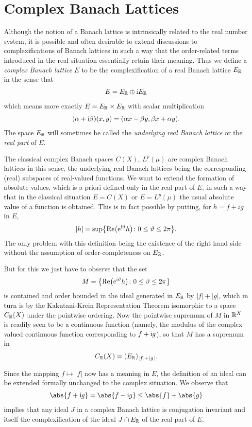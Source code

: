 \section{Complex Banach Lattices}\label{sec:c1-7}%
Although the notion of a Banach lattice is intrinsically related to the real number system, it is possible and often desirable to extend discussions to complexifications of Banach lattices in such a way that the order-related terms introduced in the real situation essentially retain their meaning.
Thus we define a \emph{complex Banach lattice} $ E $ to be the complexification of a real Banach lattice $ E_{\mathbb{R}} $ in the sense that
\[
E = E_{\mathbb{R}} \oplus \mathrm{i} E_{\mathbb{R}}
\]
which means more exactly $ E = E_{\mathbb{R}} \times E_{\mathbb{R}} $ with scalar multiplication 
%
\[
	 (\alpha+\mathrm{i}\beta)(x,y) = (\alpha x-\beta y,\beta x+\alpha y)  .
\]
%
The space $ E_{\mathbb{R}} $ will sometimes be called the \emph{underlying real Banach lattice} or the \emph{real part} of\/ $ E $.

The classical complex Banach spaces $ C(X) $, $ L^{p}(\mu) $ are complex Banach lattices in this sense, the underlying real Banach lattices being the corresponding (real) subspaces of real-valued functions.
We want to extend the formation of absolute values, which is a priori defined only in the real part of\/ $ E $, in such a way that in the classical situation $ E = C(X) $ or $ E = L^{p}(\mu) $ the usual absolute value of a function is obtained.
This is in fact possible by putting, for $ h = f + ig $ in $ E $,
\[
	|h| = \sup \mleft\{ \Re \mleft(  \eu^{\iu \theta} h \mright) \colon 0 \leq \theta \leq 2\pi \mright\}.
\]
The only problem with this definition being the existence of the right hand side without the assumption of order-completeness on $ E_{\mathbb{R}} $.

But for this we just have to observe that the set 
\[
M = \mleft\{ \Re \mleft( \eu^{\im\theta}h \mright) \colon 0 \leq \theta \leq 2\pi \mright\}
\]
is contained and order bounded in the ideal generated in $ E_{\mathbb{R}} $ by $ |f| + |g| $, which in turn is by the Kakutani-Krein Representation Theorem isomorphic to a space $ C_{\mathbb{R}}(X) $ under the pointwise ordering.
Now the pointwise supremum of\/ $ M $ in $ \mathbb{R}^{X} $ is readily seen to be a continuous function (namely, the modulus of the complex valued continuous function corresponding to $ f + \mathrm{i} g $), so that $ M $ has a supremum in 
%
\[
	C_{\mathbb{R}}(X) = (E_{\mathbb{R}})_{|f|+|g|} .
\]
%

Since the mapping $ f \mapsto |f| $ now has a meaning in $ E $, the definition of an ideal can be extended formally unchanged to the complex situation.
We observe that 
\[ 
    \abs{f + \iu g} = \abs{f - \iu g} \leq   \abs{f}   +   \abs{g}  
\]
implies that any ideal $ J $ in a complex Banach lattice 
is conjugation invariant and itself the complexification of the ideal $ J \cap E_{\mathbb{R}} $ of the real part of\/ $ E $.


